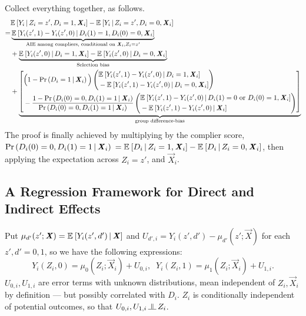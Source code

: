 Collect everything together, as follows.
\begin{align*}
    &  \mathbb{E}_{} \left[ Y_i \, \middle\vert \, Z_i = z', D_i = 1, \boldsymbol{\mathit{X}}_i \right]
    - \mathbb{E}_{} \left[ Y_i \, \middle\vert \, Z_i = z', D_i = 0, \boldsymbol{\mathit{X}}_i \right] \\
    =& \underbrace{
        \mathbb{E}_{} \left[ Y_i(z', 1) - Y_i(z', 0) \, \middle\vert \, D_i(1) =1, D_i(0)=0,\boldsymbol{\mathit{X}}_i \right]}_{
            \text{AIE among compliers, conditional on }\boldsymbol{\mathit{X}}_i, Z_i = z'} \\
    &+ \underbrace{
        \mathbb{E}_{} \left[ Y_i(z', 0) \, \middle\vert \, D_i = 1, \boldsymbol{\mathit{X}}_i \right]
            - \mathbb{E}_{} \left[ Y_i(z', 0) \, \middle\vert \, D_i = 0, \boldsymbol{\mathit{X}}_i \right]}_{
                \text{Selection bias}} \\
    &+ \underbrace{\left[ \begin{aligned}
        &\Big( 1 - \Pr\left( D_i = 1 \, \middle\vert \, \boldsymbol{\mathit{X}}_i \right) \Big)
        \left( \begin{aligned}
            &\mathbb{E}_{} \left[ Y_i(z', 1) - Y_i(z', 0) \, \middle\vert \, D_i = 1, \boldsymbol{\mathit{X}}_i \right] \\ 
            &  - \mathbb{E}_{} \left[ Y_i(z', 1) - Y_i(z', 0) \, \middle\vert \, D_i = 0, \boldsymbol{\mathit{X}}_i \right]
        \end{aligned} \right) \\
        &- \frac{1 - \Pr\left( D_i(0) = 0, D_i(1) = 1 \, \middle\vert \, \boldsymbol{\mathit{X}}_i \right) }{
            \Pr\left( D_i(0) = 0, D_i(1) = 1 \, \middle\vert \, \boldsymbol{\mathit{X}}_i \right)} 
        \left( \begin{aligned}
            &\mathbb{E}_{} \left[ Y_i(z', 1) - Y_i(z', 0) \, \middle\vert \, D_i(1) = 0 \text{ or } D_i(0)=1, \boldsymbol{\mathit{X}}_i \right] \\ 
            &  - \mathbb{E}_{} \left[ Y_i(z', 1) - Y_i(z', 0) \, \middle\vert \, \boldsymbol{\mathit{X}}_i \right]
        \end{aligned} \right)
    \end{aligned} \right] }_{
        \text{group difference-bias}}
\end{align*}
The proof is finally achieved by multiplying by the complier score, 
$\Pr\left( D_i(0) = 0, D_i(1) = 1 \, \middle\vert \, \boldsymbol{\mathit{X}}_i \right)$
$= \mathbb{E}_{} \left[ D_i \, \middle\vert \, Z_i = 1, \boldsymbol{\mathit{X}}_i \right] - \mathbb{E}_{} \left[ D_i \, \middle\vert \, Z_i = 0, \boldsymbol{\mathit{X}}_i \right]$,
then applying the expectation across $Z_i = z'$, and $\vec X_i$.

\subsection{A Regression Framework for Direct and Indirect Effects}
\label{appendix:regression-model}
Put $\mu_{d'}(z'; \boldsymbol{\mathit{X}}) = \mathbb{E}_{} \left[ Y_i(z', d') \, \middle\vert \, \boldsymbol{\mathit{X}} \right]$ and $U_{d', i} = Y_i(z', d') - \mu_{d'}(z'; \vec X)$ for each $z',d'=0,1$, so we have the following expressions:
\[ Y_i(Z_i, 0)
        = \mu_{0}(Z_i; \vec X_i) + U_{0,i}, \;\;
    Y_i(Z_i, 1)
        = \mu_{1}(Z_i; \vec X_i) + U_{1,i}. \]
$U_{0,i}, U_{1,i}$ are error terms with unknown distributions, mean independent of $Z_i, \vec X_i$ by definition --- but possibly correlated with $D_i$.
$Z_i$ is conditionally independent of potential outcomes, so that $U_{0,i}, U_{1,i} \indep Z_i$.

